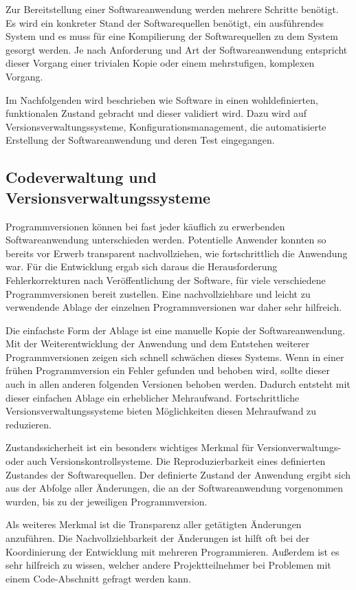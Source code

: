 Zur Bereitstellung einer Softwareanwendung werden mehrere Schritte benötigt. Es wird ein konkreter Stand der Softwarequellen benötigt, ein ausführendes System und es muss für eine Kompilierung der Softwarequellen zu dem System gesorgt werden.
Je nach Anforderung und Art der Softwareanwendung entspricht dieser Vorgang einer trivialen Kopie oder einem mehrstufigen, komplexen Vorgang. 

Im Nachfolgenden wird beschrieben wie Software in einen wohldefinierten, funktionalen Zustand gebracht und dieser validiert wird. Dazu wird auf Versionsverwaltungssysteme, Konfigurationsmanagement, die automatisierte Erstellung der Softwareanwendung und deren Test eingegangen.

\subsection{Codeverwaltung und Versionsverwaltungssysteme}

Programmversionen können bei fast jeder käuflich zu erwerbenden Softwareanwendung unterschieden werden. Potentielle 
Anwender konnten so bereits vor Erwerb transparent nachvollziehen, wie fortschrittlich die Anwendung war.
Für die Entwicklung ergab sich daraus die Herausforderung Fehlerkorrekturen nach Veröffentlichung der Software, für viele 
verschiedene Programmversionen bereit zustellen.
Eine nachvollziehbare und leicht zu verwendende Ablage der einzelnen Programmversionen war daher sehr hilfreich.

Die einfachste Form der Ablage ist eine manuelle Kopie der Softwareanwendung. Mit der Weiterentwicklung der Anwendung und 
dem Entstehen weiterer Programmversionen zeigen sich schnell schwächen dieses Systems. Wenn in einer frühen 
Programmversion ein Fehler gefunden und behoben wird, sollte dieser auch in allen anderen folgenden Versionen behoben 
werden. Dadurch entsteht mit dieser einfachen Ablage ein erheblicher Mehraufwand. Fortschrittliche 
Versionsverwaltungssysteme bieten Möglichkeiten diesen Mehraufwand zu reduzieren.

Zustandssicherheit ist ein besonders wichtiges Merkmal für Versionverwaltungs- oder auch Versionskontrollsysteme.
Die Reproduzierbarkeit eines definierten Zustandes der Softwarequellen. Der definierte Zustand der Anwendung ergibt sich 
aus der Abfolge aller Änderungen, die an der Softwareanwendung vorgenommen wurden, bis zu der jeweiligen Programmversion. 

Als weiteres Merkmal ist die Transparenz aller getätigten Änderungen anzuführen. Die Nachvollziehbarkeit der Änderungen 
ist hilft oft bei der Koordinierung der Entwicklung mit mehreren Programmieren. Außerdem ist es sehr hilfreich zu wissen, 
welcher andere Projektteilnehmer bei Problemen mit einem Code-Abschnitt gefragt werden kann. 

